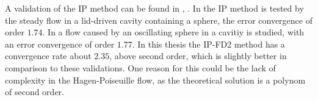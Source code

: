 A validation of the IP method can be found in \citep{Gilmanov2003}, \citep{Gilmanov2005}.
In \citep{Gilmanov2003} the IP method is tested by the steady flow in a lid-driven cavity containing a sphere, the error convergence of order $1.74$.
In  \citep{Gilmanov2005} a flow caused by an oscillating sphere in a cavitiy is studied, with an error convergence of order $1.77$.
In this thesis the IP-FD2 method has a convergence rate about $2.35$, above second order, which is slightly better in comparison to these validations.
One reason for this could be the lack of complexity in the Hagen-Poiseuille flow, as the theoretical solution is a polynom of second order.





